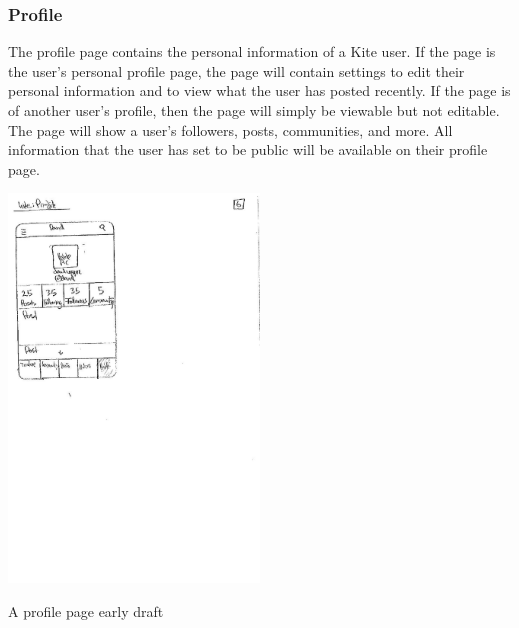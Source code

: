 \documentclass[compsoc, 10, draftclsnofoot, onecolumn]{IEEEtran}
\begin{document}
\subsubsection{Profile}
The profile page contains the personal information of a Kite user. If the page is the user's personal profile page, the page will contain settings to edit their personal information and to view what the user has posted recently. If the page is of another user's profile, then the page will simply be viewable but not editable. The page will show a user's followers, posts, communities, and more. All information that the user has set to be public will be available on their profile page. 
\begin{center}
\includegraphics[width=0.5\textwidth]{Profile}

A profile page early draft
\end{center}
\end{document}
